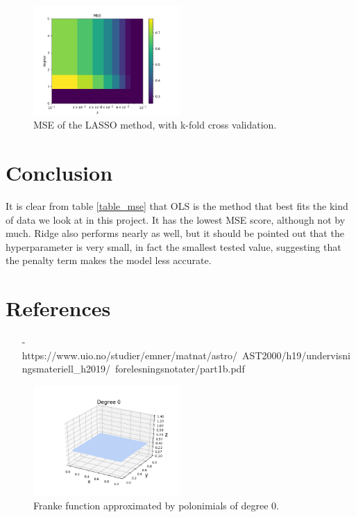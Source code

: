 \documentclass[reprint,english,notitlepage]{revtex4-1}  %
\begin{document}
\begin{figure}[h]
    \centering
    \includegraphics[width=0.50\textwidth]{LASSO_mse.png}
    \caption{MSE of the LASSO method, with k-fold cross validation.}
    \label{lasso: mse_map}
\end{figure}



\section{Conclusion}
It is clear from table \ref{table_mse} that OLS is the method that best fits the kind of data we look at in this project. It has the lowest MSE score, although not by much. Ridge also performs nearly as well, but it should be pointed out that the hyperparameter is very small, in fact the smallest tested value, suggesting that the penalty term makes the model less accurate. 



\section*{References}
\begin{itemize}
\item[-] https://www.uio.no/studier/emner/matnat/astro/\
AST2000/h19/undervisningsmateriell\_h2019/\
forelesningsnotater/part1b.pdf
\end{itemize}


\begin{figure}[h]
    \centering
    \includegraphics[width=0.50\textwidth]{OLS_deg0.png}
    \caption{Franke function approximated by polonimials of degree 0.}
    \label{ols: 0}
\end{figure}
\end{document}
